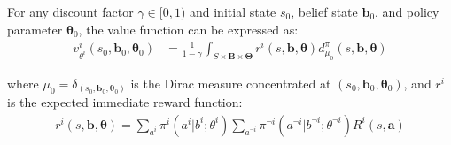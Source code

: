 \begin{lemma}
    For any discount factor $\gamma \in [0,1)$ and initial state $s_{0}$, belief
    state $\boldsymbol{b}_{0}$, and policy parameter $\boldsymbol{\theta}_{0}$,
    the value function can be expressed as:
    \begin{align}
        v^{i}_{\theta^i}(s_{0}, \boldsymbol{b}_{0}, \boldsymbol{\theta}_{0}) & = \frac{1}{1-\gamma}\int_{S \times \boldsymbol{B} \times \boldsymbol{\Theta}}r^{i}(s, \boldsymbol{b}, \boldsymbol{\theta}) d^{\pi}_{\mu_0}(s, \boldsymbol{b}, \boldsymbol{\theta})
    \end{align}

    where $\mu_{0} = \delta_{(s_0, \boldsymbol{b}_0, \boldsymbol{\theta}_0)}$ is
    the Dirac measure concentrated at
    $(s_{0}, \boldsymbol{b}_{0}, \boldsymbol{\theta}_{0})$, and $r^{i}$ is the expected
    immediate reward function:
    \begin{align}
        r^{i}(s, \boldsymbol{b}, \boldsymbol{\theta}) = \sum_{a^i}\pi^{i}(a^{i}|b^{i}; \theta^{i}) \sum_{a^{\neg i}}\pi^{\neg i}(a^{\neg i}|b^{\neg i}; \theta^{\neg i}) R^{i}(s, \boldsymbol{a})
    \end{align}
\end{lemma}
